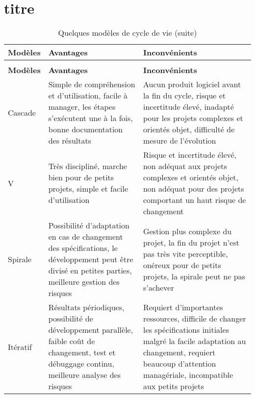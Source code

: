\chapter{titre}


\begin{center}
	\begin{longtable}{|p{}|p{}|p{}|}
		\caption{What gwan me luv?} 
		\label{modeles-cycle-vie}
		\\
		
		
		\hline 
		\textbf{Modèles} & 
		\textbf{Avantages} &
		\textbf{Inconvénients}
		\\
		
		
		\endfirsthead
		\caption[]{Quelques modèles de cycle de vie (suite)} 
		\\
		\hline 
		\textbf{Modèles} & 
		\textbf{Avantages} &
		\textbf{Inconvénients}
		\\
		\hline
		\endhead
		\hline
		\endfoot
		\hline
		
		
		\hline
		Cascade &  
		Simple  de  compréhension  et d’utilisation, facile à manager, les étapes s’exécutent une à la fois, bonne documentation des résultats &
		Aucun produit logiciel avant la fin du cycle, risque et incertitude élevé, inadapté pour les projets complexes et orientés objet, difficulté de mesure de l’évolution
		\\ 
		
		\hline
		V &  
		Très discipliné, marche bien pour de petits projets, simple et facile d’utilisation &
		Risque et incertitude élevé, non adéquat aux projets complexes et orientés objet, non adéquat pour des projets comportant un haut risque de changement
		\\  
		
		\hline
		Spirale &  
		Possibilité d’adaptation en cas de changement des spécifications, le développement peut être divisé en petites parties, meilleure gestion des risques &
		Gestion plus complexe du projet, la fin du projet n’est pas très vite perceptible, onéreux pour de petits projets, la spirale peut ne pas s’achever
		\\  
		
		\hline
		Itératif &  
		Résultats  périodiques,  possibilité de développement parallèle, faible coût de changement, test et débuggage continu, meilleure analyse des risques &
		Requiert   d’importantes   ressources, difficile de changer les spécifications initiales malgré la facile adaptation au changement, requiert  beaucoup  d’attention managériale, incompatible aux petits projets
		\\  
		

\end{longtable}
\end{center}
